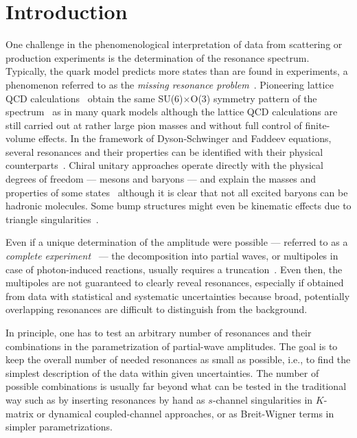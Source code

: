 \documentclass[10pt,aps,prc,superscriptaddress,twoside,twocolumn,nofootinbib,showpacs,preprintnumbers]{revtex4-1}
\begin{document}
\section{Introduction}\label{sec:intro}
One challenge in the phenomenological interpretation of data from scattering or production experiments is the determination of the resonance spectrum. Typically, the quark model predicts more states than are found in experiments, a phenomenon referred to as the {\it missing resonance problem}~\cite{Ronniger:2011td, Ferretti:2011zz, Glozman:1995fu, Bijker:1994yr, Capstick:1986bm}. Pioneering lattice QCD calculations~\cite{Edwards:2012fx, Engel:2013ig, Engel:2010my} obtain the same SU(6)$\times$O(3) symmetry  pattern of the spectrum~\cite{Edwards:2012fx} as in many quark models although the lattice QCD calculations are still carried out at rather large pion masses and without full control of finite-volume effects. In the framework of Dyson-Schwinger and Faddeev equations, several resonances and their properties can be identified with their physical
counterparts~\cite{Chen:2017pse, Eichmann:2016hgl, Lu:2017cln, Eichmann:2016yit}. Chiral unitary approaches operate directly with the physical degrees of freedom --- mesons and baryons --- and explain the masses and properties of some states~\cite{Sadasivan:2018jig, Bruns:2010sv, MartinezTorres:2009cw, Doring:2007rz, Doring:2005bx} although it is clear that not all excited baryons 
can be hadronic molecules. Some bump structures might even be  kinematic effects due to triangle singularities~\cite{Pilloni:2016obd, Samart:2017scf, Debastiani:2017dlz}.


Even if a unique determination of the amplitude were possible --- referred to as a {\it complete experiment}~\cite{Nys:2015kqa, Wunderlich:2014xya, Workman:2010xc, Sandorfi:2010uv} --- the decomposition into partial waves, or multipoles in case of photon-induced reactions, usually requires a truncation~\cite{Wunderlich:2017dby, Workman:2016irf}. Even then, the multipoles are not guaranteed to clearly reveal resonances, especially if obtained from data with statistical and systematic uncertainties because broad, potentially overlapping resonances are difficult to distinguish from the background. 

In principle, one has to test an arbitrary number of resonances and their combinations in the parametrization of partial-wave amplitudes. The goal is to keep the overall number of needed resonances as small as possible, i.e., to find the simplest description of the data within given uncertainties. The number of possible combinations is usually far beyond what can be tested in the traditional way such as by inserting resonances by hand as $s$-channel singularities in $K$-matrix or dynamical coupled-channel approaches, or as Breit-Wigner terms in simpler parametrizations. 
\end{document}
